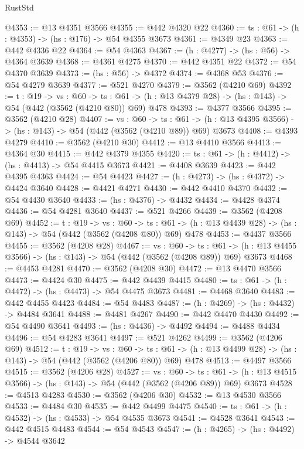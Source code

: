 \begin{lexlean}{RustStd}
\begin{coremodule}
@4353 := @13 @4351 @3566
@4355 := @442 @4320 @22
@4360 := {ts : @61} -> (h : @4353) -> (hs : @176) -> @54 @4355 @3673
@4361 := @4349 @23
@4363 := @442 @4336 @22
@4364 := @54 @4363
@4367 := (h : @4277) -> (hs : @56) -> @4364 @3639
@4368 := @4361 @4275
@4370 := @442 @4351 @22
@4372 := @54 @4370 @3639
@4373 := (hs : @56) -> @4372
@4374 := @4368 @53
@4376 := @54 @4279 @3639
@4377 := @521 @4270
@4379 := @3562 (@4210 @69)
@4392 := {t : @19} ->
  {vs : @60} ->
  {ts : @61} -> (h : @13 @4379 @28) -> (hs : @143) -> @54 (@442 (@3562 (@4210 @80)) @69) @478
@4393 := @4377 @3566
@4395 := @3562 (@4210 @28)
@4407 := {vs : @60} ->
  {ts : @61} -> (h : @13 @4395 @3566) -> (hs : @143) -> @54 (@442 (@3562 (@4210 @89)) @69) @3673
@4408 := @4393 @4279
@4410 := @3562 (@4210 @30)
@4412 := @13 @4410 @3566
@4413 := @4364 @30
@4415 := @442 @4379 @4355
@4420 := {ts : @61} -> (h : @4412) -> (hs : @4413) -> @54 @4415 @3673
@4421 := @4408 @3639
@4423 := @442 @4395 @4363
@4424 := @54 @4423
@4427 := (h : @4273) -> (hs : @4372) -> @4424 @3640
@4428 := @4421 @4271
@4430 := @442 @4410 @4370
@4432 := @54 @4430 @3640
@4433 := (hs : @4376) -> @4432
@4434 := @4428 @4374
@4436 := @54 @4281 @3640
@4437 := @521 @4266
@4439 := @3562 (@4208 @69)
@4452 := {t : @19} ->
  {vs : @60} ->
  {ts : @61} -> (h : @13 @4439 @28) -> (hs : @143) -> @54 (@442 (@3562 (@4208 @80)) @69) @478
@4453 := @4437 @3566
@4455 := @3562 (@4208 @28)
@4467 := {vs : @60} ->
  {ts : @61} -> (h : @13 @4455 @3566) -> (hs : @143) -> @54 (@442 (@3562 (@4208 @89)) @69) @3673
@4468 := @4453 @4281
@4470 := @3562 (@4208 @30)
@4472 := @13 @4470 @3566
@4473 := @4424 @30
@4475 := @442 @4439 @4415
@4480 := {ts : @61} -> (h : @4472) -> (hs : @4473) -> @54 @4475 @3673
@4481 := @4468 @3640
@4483 := @442 @4455 @4423
@4484 := @54 @4483
@4487 := (h : @4269) -> (hs : @4432) -> @4484 @3641
@4488 := @4481 @4267
@4490 := @442 @4470 @4430
@4492 := @54 @4490 @3641
@4493 := (hs : @4436) -> @4492
@4494 := @4488 @4434
@4496 := @54 @4283 @3641
@4497 := @521 @4262
@4499 := @3562 (@4206 @69)
@4512 := {t : @19} ->
  {vs : @60} ->
  {ts : @61} -> (h : @13 @4499 @28) -> (hs : @143) -> @54 (@442 (@3562 (@4206 @80)) @69) @478
@4513 := @4497 @3566
@4515 := @3562 (@4206 @28)
@4527 := {vs : @60} ->
  {ts : @61} -> (h : @13 @4515 @3566) -> (hs : @143) -> @54 (@442 (@3562 (@4206 @89)) @69) @3673
@4528 := @4513 @4283
@4530 := @3562 (@4206 @30)
@4532 := @13 @4530 @3566
@4533 := @4484 @30
@4535 := @442 @4499 @4475
@4540 := {ts : @61} -> (h : @4532) -> (hs : @4533) -> @54 @4535 @3673
@4541 := @4528 @3641
@4543 := @442 @4515 @4483
@4544 := @54 @4543
@4547 := (h : @4265) -> (hs : @4492) -> @4544 @3642

\end{coremodule}
\end{lexlean}

